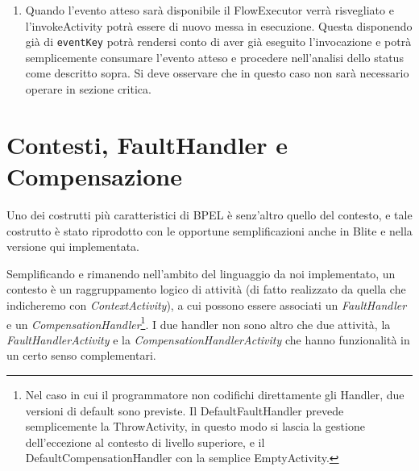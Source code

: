 \begin{enumerate}
  \item Quando l'evento atteso sarà disponibile il FlowExecutor verrà
  risvegliato e l'invokeActivity potrà essere di nuovo messa in esecuzione.
  Questa disponendo già di \texttt{eventKey} potrà rendersi conto di aver
  già eseguito l'invocazione e potrà semplicemente consumare l'evento
  atteso e procedere nell'analisi dello status come descritto sopra. Si deve
  osservare che in questo caso non sarà necessario operare in sezione critica.
\end{enumerate}

\section{Contesti, FaultHandler e Compensazione}

Uno dei costrutti più caratteristici di BPEL \`e senz'altro quello del
contesto, e tale costrutto \`e stato riprodotto con le opportune
semplificazioni anche in Blite e nella versione qui implementata.

Semplificando e rimanendo nell'ambito del linguaggio da noi implementato, un
contesto \`e un raggruppamento logico di attività (di fatto realizzato da
quella che indicheremo con \emph{ContextActivity}), a cui possono essere
associati un \emph{FaultHandler} e un \emph{CompensationHandler}\footnote{Nel
caso in cui il programmatore non codifichi direttamente gli Handler, due
versioni di default sono previste. Il DefaultFaultHandler prevede
semplicemente la ThrowActivity, in questo modo si lascia la gestione
dell'eccezione al contesto di livello superiore, e il DefaultCompensationHandler con la
semplice EmptyActivity.}. I due handler non sono altro che due attività, la \emph{FaultHandlerActivity} e la \emph{CompensationHandlerActivity} che hanno funzionalità in un certo senso complementari.

